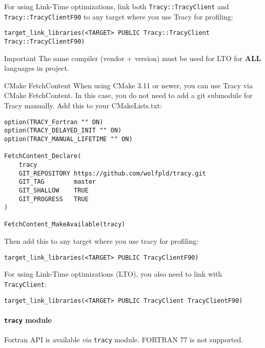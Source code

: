 \documentclass[hidelinks,titlepage,a4paper,twoside]{article}
\begin{document}
For using Link-Time optimizations, link both \texttt{Tracy::TracyClient} and \texttt{Tracy::TracyClientF90} to any target where you use Tracy for profiling:

\begin{lstlisting}
target_link_libraries(<TARGET> PUBLIC Tracy::TracyClient Tracy::TracyClientF90)
\end{lstlisting}

\begin{bclogo}[
noborder=true,
couleur=black!5,
logo=\bcbombe
]{Important}
The same compiler (vendor + version) must be used for LTO for \textbf{ALL} languages in project.
\end{bclogo}

\begin{bclogo}[
noborder=true,
couleur=black!5,
logo=\bclampe
]{CMake FetchContent}
When using CMake 3.11 or newer, you can use Tracy via CMake FetchContent. In this case, you do not need to add a git submodule for Tracy manually. Add this to your CMakeLists.txt:

\begin{lstlisting}
option(TRACY_Fortran "" ON)
option(TRACY_DELAYED_INIT "" ON)
option(TRACY_MANUAL_LIFETIME "" ON)

FetchContent_Declare(
    tracy
    GIT_REPOSITORY https://github.com/wolfpld/tracy.git
    GIT_TAG        master
    GIT_SHALLOW    TRUE
    GIT_PROGRESS   TRUE
)

FetchContent_MakeAvailable(tracy)
\end{lstlisting}

Then add this to any target where you use tracy for profiling:

\begin{lstlisting}
target_link_libraries(<TARGET> PUBLIC TracyClientF90)
\end{lstlisting}

For using Link-Time optimizations (LTO), you also need to link with \texttt{TracyClient}:

\begin{lstlisting}
target_link_libraries(<TARGET> PUBLIC TracyClient TracyClientF90)
\end{lstlisting}
\end{bclogo}

\paragraph{\texttt{tracy} module}

Fortran API is available \textit{via} \texttt{tracy} module. FORTRAN 77 is not supported.
\end{document}
